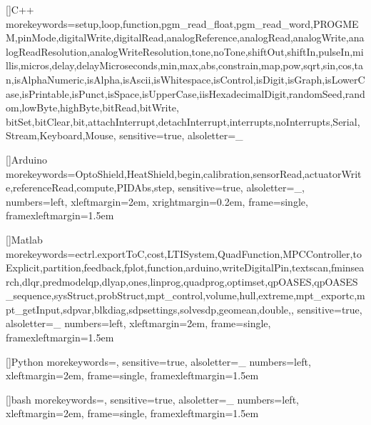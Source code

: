 []{C++}      %
{morekeywords={setup,loop,function,pgm_read_float,pgm_read_word,PROGMEM,pinMode,digitalWrite,digitalRead,analogReference,analogRead,analogWrite,analogReadResolution,analogWriteResolution,tone,noTone,shiftOut,shiftIn,pulseIn,millis,micros,delay,delayMicroseconds,min,max,abs,constrain,map,pow,sqrt,sin,cos,tan,isAlphaNumeric,isAlpha,isAscii,isWhitespace,isControl,isDigit,isGraph,isLowerCase,isPrintable,isPunct,isSpace,isUpperCase,iisHexadecimalDigit,randomSeed,random,lowByte,highByte,bitRead,bitWrite,
bitSet,bitClear,bit,attachInterrupt,detachInterrupt,interrupts,noInterrupts,Serial,Stream,Keyboard,Mouse},
sensitive=true,
alsoletter={_}
}

[]{Arduino}      %
{morekeywords={OptoShield,HeatShield,begin,calibration,sensorRead,actuatorWrite,referenceRead,compute,PIDAbs,step},
sensitive=true,
alsoletter={_},
numbers=left,
xleftmargin=2em,
xrightmargin=0.2em,
frame=single,
framexleftmargin=1.5em
}

[]{Matlab}      {morekeywords={ectrl.exportToC,cost,LTISystem,QuadFunction,MPCController,toExplicit,partition,feedback,fplot,function,arduino,writeDigitalPin,textscan,fminsearch,dlqr,predmodelqp,dlyap,ones,linprog,quadprog,optimset,qpOASES,qpOASES_sequence,sysStruct,probStruct,mpt_control,volume,hull,extreme,mpt_exportc,mpt_getInput,sdpvar,blkdiag,sdpsettings,solvesdp,geomean,double,},
sensitive=true,
alsoletter={_}
numbers=left,
xleftmargin=2em,
frame=single,
framexleftmargin=1.5em
}

[]{Python}
{morekeywords={},
sensitive=true,
alsoletter={_}
numbers=left,
xleftmargin=2em,
frame=single,
framexleftmargin=1.5em}

[]{bash}
{morekeywords={},
sensitive=true,
alsoletter={_}
numbers=left,
xleftmargin=2em,
frame=single,
framexleftmargin=1.5em}



